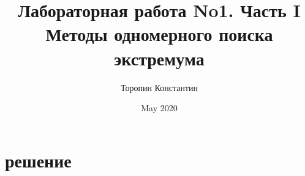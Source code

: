 \documentclass[11pt]{article}
\title{Лабораторная работа No1. Часть I Методы одномерного поиска экстремума}
\author{Торопин Константин}
\date{May 2020}
\begin{document}
    \maketitle

    \chapter{решение}
\end{document}
